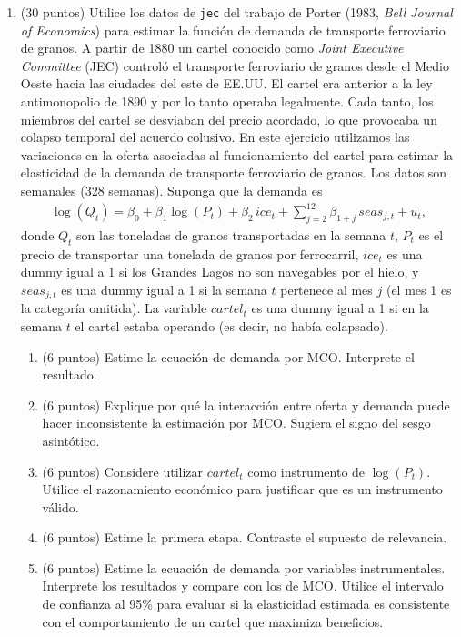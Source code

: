 \documentclass[letterpaper,11pt]{article}
\begin{document}
\begin{enumerate}
\item (30 puntos) Utilice los datos de \texttt{jec} del trabajo de Porter (1983, \textit{Bell
    Journal of Economics}) para estimar la función de demanda de transporte ferroviario de
    granos. A partir de 1880 un cartel conocido como \textit{Joint Executive Committee} (JEC)
    controló el transporte ferroviario de granos desde el Medio Oeste hacia las ciudades del
    este de EE.UU. El cartel era anterior a la ley antimonopolio de 1890 y por lo tanto operaba
    legalmente. Cada tanto, los miembros del cartel se desviaban del precio acordado, lo que
    provocaba un colapso temporal del acuerdo colusivo. En este ejercicio utilizamos las
    variaciones en la oferta asociadas al funcionamiento del cartel para estimar la elasticidad
    de la demanda de transporte ferroviario de granos. Los datos son semanales (328 semanas).
    Suponga que la demanda es
    \begin{align*}
    \log(Q_t)=\beta_0+\beta_1\log(P_t)+\beta_2\, ice_t+\sum_{j=2}^{12}\beta_{1+j}\, seas_{j,t}+u_t,
    \end{align*}
    donde $Q_t$ son las toneladas de granos transportadas en la semana $t$, $P_t$ es el precio
    de transportar una tonelada de granos por ferrocarril, $ice_t$ es una dummy igual a 1 si los
    Grandes Lagos no son navegables por el hielo, y $seas_{j,t}$ es una dummy igual a 1 si la
    semana $t$ pertenece al mes $j$ (el mes 1 es la categoría omitida). La variable $cartel_t$
    es una dummy igual a 1 si en la semana $t$ el cartel estaba operando (es decir, no había
    colapsado).
    \begin{enumerate}
        \item (6 puntos) Estime la ecuación de demanda por MCO. Interprete el resultado.
        \item (6 puntos) Explique por qué la interacción entre oferta y demanda puede hacer
            inconsistente la estimación por MCO. Sugiera el signo del sesgo asintótico.
        \item (6 puntos) Considere utilizar $cartel_t$ como instrumento de $\log(P_t)$. Utilice el
            razonamiento económico para justificar que es un instrumento válido.
        \item (6 puntos) Estime la primera etapa. Contraste el supuesto de relevancia.
        \item (6 puntos) Estime la ecuación de demanda por variables instrumentales. Interprete
            los resultados y compare con los de MCO. Utilice el intervalo de confianza al 95\%
            para evaluar si la elasticidad estimada es consistente con el comportamiento de un
            cartel que maximiza beneficios.
    \end{enumerate}

\end{enumerate}
\end{document}
